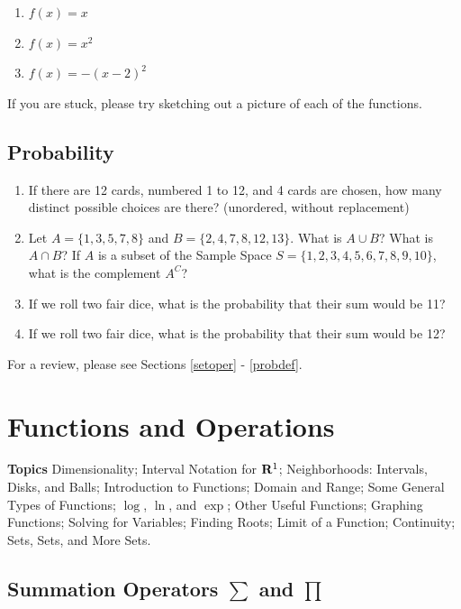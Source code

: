 \documentclass[]{book}
\providecommand{\tightlist}{%
  \setlength{\itemsep}{0pt}\setlength{\parskip}{0pt}}
\theoremstyle{definition}
\theoremstyle{definition}
\theoremstyle{definition}
\theoremstyle{remark}
\begin{document}
\begin{enumerate}
\def\labelenumi{\arabic{enumi}.}
\tightlist
\item
  \(f(x) = x\)
\item
  \(f(x) = x^2\)
\item
  \(f(x) = -(x - 2)^2\)
\end{enumerate}

If you are stuck, please try sketching out a picture of each of the functions.

\hypertarget{probability}{%
\section*{Probability}\label{probability}}

\begin{enumerate}
\def\labelenumi{\arabic{enumi}.}
\tightlist
\item
  If there are 12 cards, numbered 1 to 12, and 4 cards are chosen, how many distinct possible choices are there? (unordered, without replacement)
\item
  Let \(A = \{1,3,5,7,8\}\) and \(B = \{2,4,7,8,12,13\}\). What is \(A \cup B\)? What is \(A \cap B\)? If \(A\) is a subset of the Sample Space \(S = \{1,2,3,4,5,6,7,8,9,10\}\), what is the complement \(A^C\)?
\item
  If we roll two fair dice, what is the probability that their sum would be 11?
\item
  If we roll two fair dice, what is the probability that their sum would be 12?
\end{enumerate}

For a review, please see Sections \ref{setoper} - \ref{probdef}.

\hypertarget{functions-and-operations}{%
\chapter{Functions and Operations}\label{functions-and-operations}}

\textbf{Topics}
Dimensionality;
Interval Notation for \({\bf R}^1\);
Neighborhoods: Intervals, Disks, and Balls; Introduction to Functions;
Domain and Range;
Some General Types of Functions;
\(\log\), \(\ln\), and \(\exp\);
Other Useful Functions;
Graphing Functions;
Solving for Variables;
Finding Roots;
Limit of a Function;
Continuity; Sets, Sets, and More Sets.

\hypertarget{sum-notation}{%
\section{\texorpdfstring{Summation Operators \(\sum\) and \(\prod\)}{Summation Operators \textbackslash{}sum and \textbackslash{}prod}}\label{sum-notation}}
\end{document}
